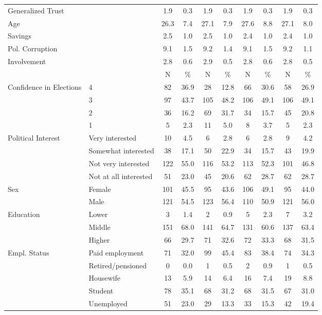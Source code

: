 \begin{table}[!htbp]
{\begin{tabular}[t]{llcccccccc}
\multicolumn{2}{l}{Generalized Trust }  & 1.9 & 0.3 & 1.9 & 0.3 & 1.9 & 0.3 & 1.9 & 0.3\\
\multicolumn{2}{l}{Age }  & 26.3 & 7.4 & 27.1 & 7.9 & 27.6 & 8.8 & 27.1 & 8.0\\
\multicolumn{2}{l}{Savings }  & 2.5 & 1.0 & 2.5 & 1.0 & 2.4 & 1.0 & 2.4 & 1.0\\
\multicolumn{2}{l}{Pol. Corruption }  & 9.1 & 1.5 & 9.2 & 1.4 & 9.1 & 1.5 & 9.2 & 1.1\\
\multicolumn{2}{l}{Involvement }  & 2.8 & 0.6 & 2.9 & 0.5 & 2.8 & 0.6 & 2.8 & 0.5\\
\midrule
 &  & N & \% & N & \% & N & \% & N & \%\\
\midrule
Confidence in Elections & 4 & 82 & 36.9 & 28 & 12.8 & 66 & 30.6 & 58 & 26.9\\
 & 3 & 97 & 43.7 & 105 & 48.2 & 106 & 49.1 & 106 & 49.1\\
 & 2 & 36 & 16.2 & 69 & 31.7 & 34 & 15.7 & 45 & 20.8\\
 & 1 & 5 & 2.3 & 11 & 5.0 & 8 & 3.7 & 5 & 2.3\\
Political Interest & Very interested & 10 & 4.5 & 6 & 2.8 & 6 & 2.8 & 9 & 4.2\\
 & Somewhat interested & 38 & 17.1 & 50 & 22.9 & 34 & 15.7 & 43 & 19.9\\
 & Not very interested & 122 & 55.0 & 116 & 53.2 & 113 & 52.3 & 101 & 46.8\\
 & Not at all interested & 51 & 23.0 & 45 & 20.6 & 62 & 28.7 & 62 & 28.7\\
Sex & Female & 101 & 45.5 & 95 & 43.6 & 106 & 49.1 & 95 & 44.0\\
 & Male & 121 & 54.5 & 123 & 56.4 & 110 & 50.9 & 121 & 56.0\\
Education & Lower & 3 & 1.4 & 2 & 0.9 & 5 & 2.3 & 7 & 3.2\\
 & Middle & 151 & 68.0 & 141 & 64.7 & 131 & 60.6 & 137 & 63.4\\
 & Higher & 66 & 29.7 & 71 & 32.6 & 72 & 33.3 & 68 & 31.5\\
Empl. Status & Paid employment & 71 & 32.0 & 99 & 45.4 & 83 & 38.4 & 74 & 34.3\\
 & Retired/pensioned & 0 & 0.0 & 1 & 0.5 & 2 & 0.9 & 1 & 0.5\\
 & Housewife & 13 & 5.9 & 14 & 6.4 & 16 & 7.4 & 19 & 8.8\\
 & Student & 78 & 35.1 & 68 & 31.2 & 68 & 31.5 & 67 & 31.0\\
 & Unemployed & 51 & 23.0 & 29 & 13.3 & 33 & 15.3 & 42 & 19.4\\

\end{tabular}}
\end{table}
